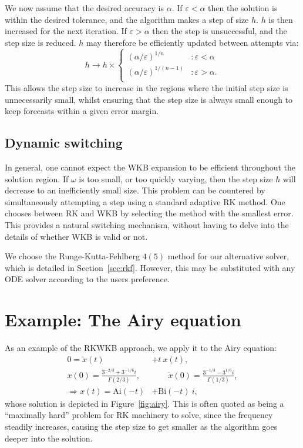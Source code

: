 We now assume that the desired accuracy is \(\alpha\). If \(\varepsilon<\alpha\) then the solution is within the desired tolerance, and the algorithm makes a step of size \(h\). \(h\) is then increased for the next iteration. If \(\varepsilon>\alpha\) then the step is unsuccessful, and the step size is reduced. \(h\) may therefore be efficiently updated between attempts via:
\begin{equation}
  h \to h\times\left\{
  \begin{array}{lr}
    {(\alpha/\varepsilon)}^{1/n} &: \varepsilon<\alpha \\
    {(\alpha/\varepsilon)}^{1/(n-1)} &: \varepsilon>\alpha. \\
  \end{array}
  \right.\label{eqn:h_update}
\end{equation}
This allows the step size to increase in the regions where the initial step size is unnecessarily small, whilst ensuring that the step size is always small enough to keep forecasts within a given error margin.

\subsection{Dynamic switching}
In general, one cannot expect the WKB expansion to be efficient throughout the solution region. If \(\omega\) is too small, or too quickly varying, then the step size \(h\) will decrease to an inefficiently small size. This problem can be countered by simultaneously attempting a step using a standard adaptive RK method. One chooses between RK and WKB by selecting the method with the smallest error. This provides a natural switching mechanism, without having to delve into the details of whether WKB is valid or not.

We choose the Runge-Kutta-Fehlberg \(4(5)\) method for our alternative solver, which is detailed in Section~\ref{sec:rkf}. However, this may be substituted with any ODE solver according to the users preference.

\section{Example: The Airy equation}


As an example of the RKWKB approach, we apply it to the Airy equation:
\begin{align}
  0=\ddot{x}(t) &+ t\: x(t) ,
  \label{eqn:airy_equation}\\
  x(0)=\frac{3^{-2/3}+3^{-1/6}i}{\Gamma(2/3)},
  &\qquad
  \dot{x}(0) = \frac{3^{-1/3}-3^{1/6}i}{\Gamma(1/3)},
  \nonumber\\
  \Rightarrow x(t) = \mathrm{Ai}(-t) &+ \mathrm{Bi}(-t)\:i,
  \label{eqn:airy_solution}
\end{align}
whose solution is depicted in Figure~\ref{fig:airy}. This is often quoted as being a ``maximally hard'' problem for RK machinery to solve, since the frequency steadily increases, causing the step size to get smaller as the algorithm goes deeper into the solution.

